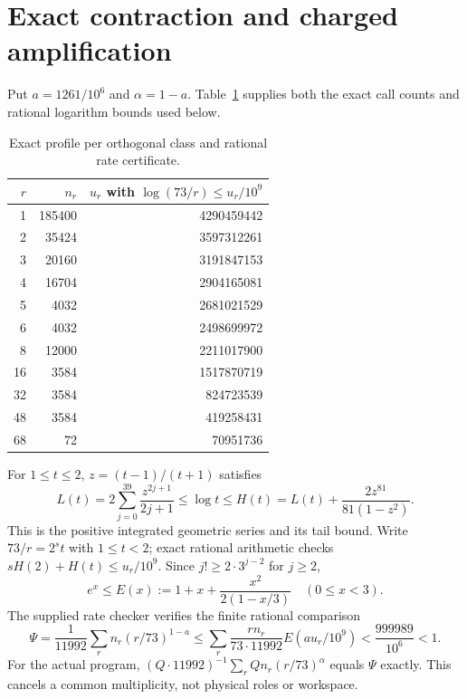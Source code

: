 \documentclass[11pt]{amsart}
\theoremstyle{remark}
\begin{document}
\section{Exact contraction and charged amplification}
Put $a=1261/10^6$ and $\alpha=1-a$. Table~\ref{tab:rate} supplies both
the exact call counts and rational logarithm bounds used below.
\begin{table}[ht]
\centering\small
\begin{tabular}{rrr}
\toprule
$r$ & $n_r$ & $u_r$ with $\log(73/r)\le u_r/10^9$\\\midrule
1&185400&4290459442\\
2&35424&3597312261\\
3&20160&3191847153\\
4&16704&2904165081\\
5&4032&2681021529\\
6&4032&2498699972\\
8&12000&2211017900\\
16&3584&1517870719\\
32&3584&824723539\\
48&3584&419258431\\
68&72&70951736\\\bottomrule
\end{tabular}
\caption{Exact profile per orthogonal class and rational rate certificate.}
\label{tab:rate}
\end{table}
For $1\le t\le2$, $z=(t-1)/(t+1)$ satisfies
\[
 L(t)=2\sum_{j=0}^{39}\frac{z^{2j+1}}{2j+1}
 \le\log t\le H(t)=L(t)+\frac{2z^{81}}{81(1-z^2)}.
\]
This is the positive integrated geometric series and its tail bound.
Write $73/r=2^st$ with $1\le t<2$; exact rational arithmetic checks
$sH(2)+H(t)\le u_r/10^9$. Since $j!\ge2\cdot3^{j-2}$ for $j\ge2$,
\[
 e^x\le E(x):=1+x+\frac{x^2}{2(1-x/3)}\quad(0\le x<3).
\]
The supplied rate checker verifies the finite rational comparison
\begin{equation}\label{eq:moment}
 \Psi=\frac1{11992}\sum_rn_r(r/73)^{1-a}
 \le\sum_r\frac{rn_r}{73\cdot11992}E(au_r/10^9)
 <\frac{999989}{10^6}<1.
\end{equation}
For the actual program, $(Q\cdot11992)^{-1}\sum_rQn_r(r/73)^\alpha$
equals $\Psi$ exactly. This cancels a common multiplicity, not physical
roles or workspace.
\end{document}
